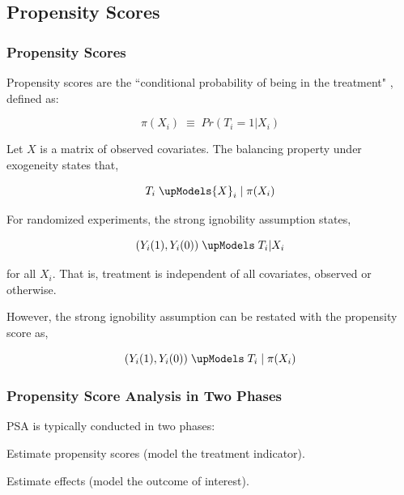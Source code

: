 \documentclass[10pt,handout,mathserif]{beamer}
\begin{document}
\subsection{Propensity Scores}

\begin{frame}
	\frametitle{Propensity Scores}
    Propensity scores are the ``conditional probability of being in the treatment" \cite{RosenbaumRubin1983}, defined as:
    
    \begin{equation}
    \pi ({ X }_{ i }) \; \equiv \; Pr({ T }_{ i } = 1 | { X }_{ i })
    \end{equation}
    \pause
    
    Let $X$ is a matrix of observed covariates. The balancing property under exogeneity states that,

    \begin{equation}
    { T }_{ i } \; \upModels { X }_{ i } \;| \; \pi ({ X }_{ i })
    \end{equation}
    
    \pause
    For randomized experiments, the strong ignobility assumption states,

    \begin{equation}
    ({ Y }_{ i }(1),{ Y }_{ i }(0)) \; \upModels \; { T }_{ i }|{ X }_{ i }
    \end{equation}

    for all ${X}_{i}$. That is, treatment is independent of all covariates, observed or otherwise. 
    
    \pause
    However, the strong ignobility assumption can be restated with the propensity score as,

    \begin{equation}
    ({ Y }_{ i }(1),{ Y }_{ i }(0)) \; \upModels \; { T }_{ i } \; | \; \pi({ X }_{ i })
    \end{equation}

\end{frame}

\begin{frame}[c]
    \frametitle{Propensity Score Analysis in Two Phases}
    PSA is typically conducted in two phases:
    \vspace{15pt}
    \begin{description}
    \setlength{\itemsep}{15pt}
        \item[Phase 1] Estimate propensity scores (model the treatment indicator).
        \item[Phase 2] Estimate effects (model the outcome of interest).
    \end{description}
\end{frame}
\end{document}
